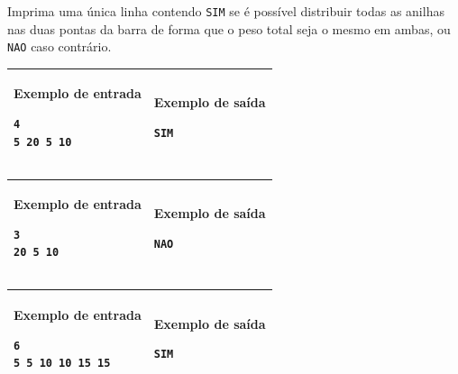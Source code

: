 Imprima uma única linha contendo \verb|SIM| se é possível distribuir todas as
anilhas nas duas pontas da barra de forma que o peso total seja o mesmo em
ambas, ou \verb|NAO| caso contrário.

\begin{table}[!h]
\centering
\begin{tabular}{|l|l|}
\hline
\begin{minipage}[t]{3in}
\textbf{Exemplo de entrada}
\begin{verbatim}
4
5 20 5 10
\end{verbatim}
\vspace{1mm}
\end{minipage}
&
\begin{minipage}[t]{3in}
\textbf{Exemplo de saída}
\begin{verbatim}
SIM
\end{verbatim}
\vspace{1mm}
\end{minipage} \\
\hline
\end{tabular}
\end{table}

\begin{table}[!h]
\centering
\begin{tabular}{|l|l|}
\hline
\begin{minipage}[t]{3in}
\textbf{Exemplo de entrada}
\begin{verbatim}
3
20 5 10
\end{verbatim}
\vspace{1mm}
\end{minipage}
&
\begin{minipage}[t]{3in}
\textbf{Exemplo de saída}
\begin{verbatim}
NAO
\end{verbatim}
\vspace{1mm}
\end{minipage} \\
\hline
\end{tabular}
\end{table}

\begin{table}[!h]
\centering
\begin{tabular}{|l|l|}
\hline
\begin{minipage}[t]{3in}
\textbf{Exemplo de entrada}
\begin{verbatim}
6
5 5 10 10 15 15
\end{verbatim}
\vspace{1mm}
\end{minipage}
&
\begin{minipage}[t]{3in}
\textbf{Exemplo de saída}
\begin{verbatim}
SIM
\end{verbatim}
\vspace{1mm}
\end{minipage} \\
\hline
\end{tabular}
\end{table}
